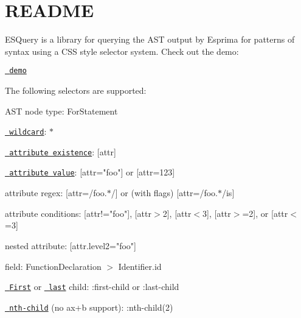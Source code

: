 \chapter{README}
\hypertarget{md__2home_2solype_2delivery_2current__days_2trello_2front_2node__modules_2esquery_2README}{}\label{md__2home_2solype_2delivery_2current__days_2trello_2front_2node__modules_2esquery_2README}
ESQuery is a library for querying the AST output by Esprima for patterns of syntax using a CSS style selector system. Check out the demo\+:

\href{https://estools.github.io/esquery/}{\texttt{ demo}}

The following selectors are supported\+:
\begin{DoxyItemize}
\item AST node type\+: {\ttfamily For\+Statement}
\item \href{http://dev.w3.org/csswg/selectors4/\#universal-selector}{\texttt{ wildcard}}\+: {\ttfamily \texorpdfstring{$\ast$}{*}}
\item \href{http://dev.w3.org/csswg/selectors4/\#attribute-selectors}{\texttt{ attribute existence}}\+: {\ttfamily \mbox{[}attr\mbox{]}}
\item \href{http://dev.w3.org/csswg/selectors4/\#attribute-selectors}{\texttt{ attribute value}}\+: {\ttfamily \mbox{[}attr="{}foo"{}\mbox{]}} or {\ttfamily \mbox{[}attr=123\mbox{]}}
\item attribute regex\+: {\ttfamily \mbox{[}attr=/foo.\texorpdfstring{$\ast$}{*}/\mbox{]}} or (with flags) {\ttfamily \mbox{[}attr=/foo.\texorpdfstring{$\ast$}{*}/is\mbox{]}}
\item attribute conditions\+: {\ttfamily \mbox{[}attr!="{}foo"{}\mbox{]}}, {\ttfamily \mbox{[}attr\texorpdfstring{$>$}{>}2\mbox{]}}, {\ttfamily \mbox{[}attr\texorpdfstring{$<$}{<}3\mbox{]}}, {\ttfamily \mbox{[}attr\texorpdfstring{$>$}{>}=2\mbox{]}}, or {\ttfamily \mbox{[}attr\texorpdfstring{$<$}{<}=3\mbox{]}}
\item nested attribute\+: {\ttfamily \mbox{[}attr.\+level2="{}foo"{}\mbox{]}}
\item field\+: {\ttfamily Function\+Declaration \texorpdfstring{$>$}{>} Identifier.\+id}
\item \href{http://dev.w3.org/csswg/selectors4/\#the-first-child-pseudo}{\texttt{ First}} or \href{http://dev.w3.org/csswg/selectors4/\#the-last-child-pseudo}{\texttt{ last}} child\+: {\ttfamily \+:first-\/child} or {\ttfamily \+:last-\/child}
\item \href{http://dev.w3.org/csswg/selectors4/\#the-nth-child-pseudo}{\texttt{ nth-\/child}} (no ax+b support)\+: {\ttfamily \+:nth-\/child(2)}

\end{DoxyItemize}
